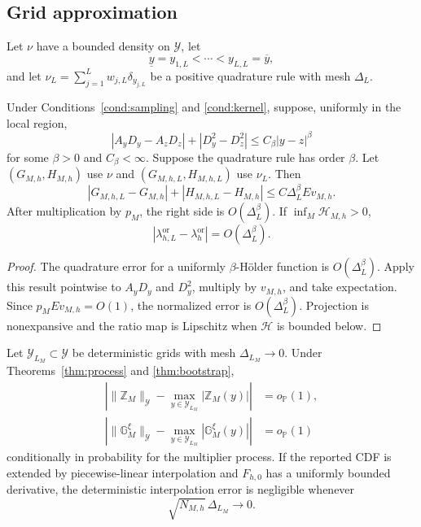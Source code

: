 \subsection{Grid approximation}

Let \(\nu\) have a bounded density on \(\mathcal Y\), let
\[
\underline y=y_{1,L}<\cdots<y_{L,L}=\overline y,
\]
and let \(\nu_L=\sum_{j=1}^Lw_{j,L}\delta_{y_{j,L}}\) be a positive quadrature rule with mesh \(\Delta_L\).

\begin{proposition}
\label{prop:quadrature}
Under Conditions~\ref{cond:sampling} and \ref{cond:kernel}, suppose, uniformly
in the local region,
\[
|A_yD_y-A_zD_z|+|D_y^2-D_z^2|
\le C_\beta|y-z|^\beta
\]
for some \(\beta>0\) and \(C_\beta<\infty\). Suppose the quadrature rule has order \(\beta\). Let \((G_{M,h},H_{M,h})\) use \(\nu\) and \((G_{M,h,L},H_{M,h,L})\) use \(\nu_L\). Then
\[
|G_{M,h,L}-G_{M,h}|+|H_{M,h,L}-H_{M,h}|
\le
C\Delta_L^\beta E v_{M,h}.
\]
After multiplication by \(p_M\), the right side is \(O(\Delta_L^\beta)\). If \(\inf_M\mathcal H_{M,h}>0\),
\[
|\lambda_{h,L}^{\mathrm{or}}-\lambda_h^{\mathrm{or}}|
=O(\Delta_L^\beta).
\]
\end{proposition}

\begin{proof}
The quadrature error for a uniformly \(\beta\)-H\"older function is \(O(\Delta_L^\beta)\). Apply this result pointwise to \(A_yD_y\) and \(D_y^2\), multiply by \(v_{M,h}\), and take expectation. Since \(p_ME v_{M,h}=O(1)\), the normalized error is \(O(\Delta_L^\beta)\). Projection is nonexpansive and the ratio map is Lipschitz when \(\mathcal H\) is bounded below.
\end{proof}

\begin{proposition}
\label{prop:growing-grid}
Let \(\mathcal Y_{L_M}\subset\mathcal Y\) be deterministic grids with mesh \(\Delta_{L_M}\to0\). Under Theorems~\ref{thm:process} and \ref{thm:bootstrap},
\begin{align*}
\left|
\|\mathbb Z_M\|_{\mathcal Y}
-
\max_{y\in\mathcal Y_{L_M}}|\mathbb Z_M(y)|
\right|&=o_{\mathbb P}(1),\\
\left|
\|\mathbb G_M^\xi\|_{\mathcal Y}
-
\max_{y\in\mathcal Y_{L_M}}|\mathbb G_M^\xi(y)|
\right|&=o_{\mathbb P}(1)
\end{align*}
conditionally in probability for the multiplier process. If the reported CDF is extended by piecewise-linear interpolation and \(F_{h,0}\) has a uniformly bounded derivative, the deterministic interpolation error is negligible whenever
\[
\sqrt{N_{M,h}}\,\Delta_{L_M}\to0.
\]
\end{proposition}


